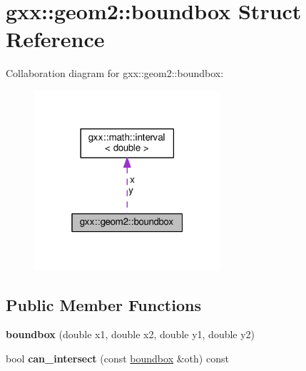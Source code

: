 \hypertarget{structgxx_1_1geom2_1_1boundbox}{}\section{gxx\+:\+:geom2\+:\+:boundbox Struct Reference}
\label{structgxx_1_1geom2_1_1boundbox}


Collaboration diagram for gxx\+:\+:geom2\+:\+:boundbox\+:
\nopagebreak
\begin{figure}[H]
\begin{center}
\leavevmode
\includegraphics[width=196pt]{structgxx_1_1geom2_1_1boundbox__coll__graph}
\end{center}
\end{figure}
\subsection*{Public Member Functions}
\begin{DoxyCompactItemize}
\item 
{\bfseries boundbox} (double x1, double x2, double y1, double y2)\hypertarget{structgxx_1_1geom2_1_1boundbox_a557ce252a0c79cd3fcdd6bfdc8083eb6}{}\label{structgxx_1_1geom2_1_1boundbox_a557ce252a0c79cd3fcdd6bfdc8083eb6}

\item 
bool {\bfseries can\+\_\+intersect} (const \hyperlink{structgxx_1_1geom2_1_1boundbox}{boundbox} \&oth) const \hypertarget{structgxx_1_1geom2_1_1boundbox_a89aa04b662e689b2ca5c1ebbeb4267ac}{}\label{structgxx_1_1geom2_1_1boundbox_a89aa04b662e689b2ca5c1ebbeb4267ac}

\end{DoxyCompactItemize}
